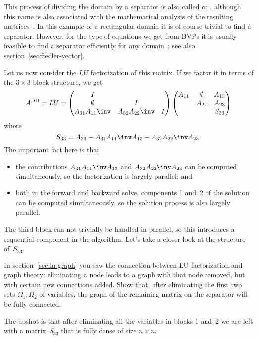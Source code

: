 This process of dividing the domain by a separator is also called
 or ,
although this name is also associated with the mathematical analysis
of the resulting matrices~\cite{BGSm:96}. In this example of a
rectangular domain it is of course trivial to find a
separator. However, for the type of equations we get from \acp{BVP} it
is usually feasible to find a separator
efficiently for any domain~\cite{LiTa:separator}; 
see also section~\ref{sec:fiedler-vector}.

Let us now consider the $LU$ factorization of this matrix. If we
factor it in terms of the $3\times 3$ block structure, we get
\[
  \Add=LU=
  \begin{pmatrix}
    I\\
    \emptyset&I\\
    A_{31}A_{11}\inv&A_{32}A_{22}\inv&I
  \end{pmatrix}
  \begin{pmatrix}
    A_{11}&\emptyset&A_{13}\\
         &A_{22}&A_{23}\\
    &&S_{33}
  \end{pmatrix}
\]
where \[ S_{33}=A_{33}-A_{31}A_{11}\inv A_{13}-A_{32}A_{22}\inv A_{23}. \]
The important fact here is that 
\begin{itemize}
\item the contributions $A_{31}A_{11}\inv A_{13}$ and
  $A_{32}A_{22}\inv A_{23}$ can be computed simultaneously, so the
  factorization is largely parallel; and
\item both in the forward and backward solve, components 1 and~2 of
  the solution can be computed simultaneously, so the solution process
  is also largely parallel.
\end{itemize}
The third block can not trivially be handled in parallel, so this
introduces a sequential component in the algorithm.
Let's take a closer look at the structure of~$S_{33}$.

\begin{exercise}
  In section~\ref{sec:lu-graph} you saw the connection between LU
  factorization and graph theory: eliminating a node leads to a graph
  with that node removed, but with certain new connections added.
  Show that, after eliminating the first two sets $\Omega_1,\Omega_2$ of variables,
  the graph of the remaining matrix on
  the separator will be fully connected.
\end{exercise}

The upshot is that after eliminating all the variables in blocks 1
and~2 we are left with a matrix~$S_{33}$ that is fully
dense of size $n\times n$. 

